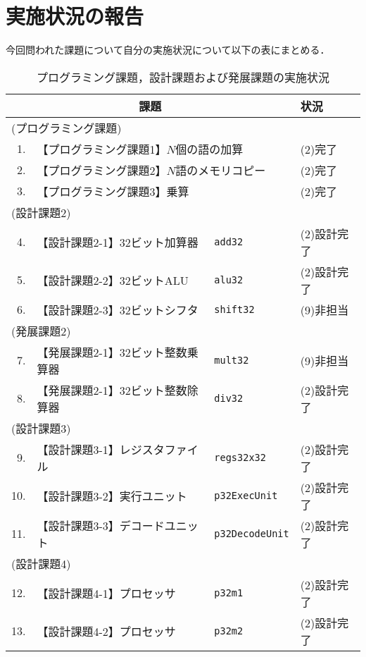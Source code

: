 \documentclass[autodetect-engine,dvi=dvipdfmx,ja=standard,
               a4j,11pt]{bxjsarticle}
\begin{document}
\section{実施状況の報告}
今回問われた課題について自分の実施状況について以下の表にまとめる．
\begin{table}[b]
    \caption{プログラミング課題，設計課題および発展課題の実施状況}
    \label{tab:プログラミング課題，設計課題および発展課題の実施状況}
    \begin{center}
    {\small
    \begin{tabular}{rll|l}
    \hline
    \hline
    \multicolumn{3}{c|}{課題} & 状況 \\
    \hline
    \multicolumn{3}{l|}{(プログラミング課題)} & \\
    1. & \multicolumn{2}{l|}{【プログラミング課題1】$N$個の語の加算 } & (2)完了 \\
    2. & \multicolumn{2}{l|}{【プログラミング課題2】$N$語のメモリコピー} & (2)完了 \\
    3. & \multicolumn{2}{l|}{【プログラミング課題3】乗算} & (2)完了 \\
    \multicolumn{3}{l|}{(設計課題2)} & \\
    4. & 【設計課題2-1】32ビット加算器   & \verb|add32|          & (2)設計完了 \\
    5. & 【設計課題2-2】32ビットALU      & \verb|alu32|          & (2)設計完了 \\
    6. & 【設計課題2-3】32ビットシフタ   & \verb|shift32|        & (9)非担当 \\
    \multicolumn{3}{l|}{(発展課題2)} & \\
    7. & 【発展課題2-1】32ビット整数乗算器 & \verb|mult32|       & (9)非担当 \\
    8. & 【発展課題2-1】32ビット整数除算器 & \verb|div32|        & (2)設計完了 \\
    \multicolumn{3}{l|}{(設計課題3)} & \\
    9. & 【設計課題3-1】レジスタファイル & \verb|regs32x32|      & (2)設計完了 \\
    10. & 【設計課題3-2】実行ユニット     & \verb|p32ExecUnit|    & (2)設計完了 \\
    11. & 【設計課題3-3】デコードユニット & \verb|p32DecodeUnit|  & (2)設計完了 \\
    \multicolumn{3}{l|}{(設計課題4)} & \\
    12. & 【設計課題4-1】プロセッサ      & \verb|p32m1|          & (2)設計完了 \\
    13. & 【設計課題4-2】プロセッサ      & \verb|p32m2|          & (2)設計完了 \\

\end{tabular}}
\end{center}
\end{table}
\end{document}
